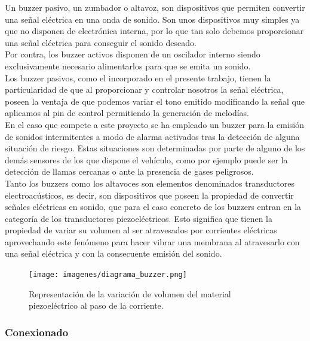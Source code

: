 Un buzzer pasivo, un zumbador o altavoz, son dispositivos que permiten convertir una señal eléctrica en una onda de sonido. Son unos dispositivos muy simples ya que no disponen 
de electrónica interna, por lo que tan solo debemos proporcionar una señal eléctrica para conseguir el sonido deseado.\\

Por contra, los buzzer activos disponen de un oscilador interno siendo exclusivamente necesario alimentarlos para que se emita un sonido.\\

Los buzzer pasivos, como el incorporado en el presente trabajo, tienen la particularidad de que al proporcionar y controlar nosotros la señal eléctrica, poseen la ventaja de
que podemos variar el tono emitido modificando la señal que aplicamos al pin de control permitiendo la generación de melodías.\\

En el caso que compete a este proyecto se ha empleado un buzzer para la emisión de sonidos intermitentes a modo de alarma activados tras la detección de alguna situación de riesgo.
Estas situaciones son determinadas por parte de alguno de los demás sensores de los que dispone el vehículo, como por ejemplo
puede ser la detección de llamas cercanas o ante la presencia de gases peligrosos.\\


Tanto los buzzers como los altavoces son elementos denominados transductores electroacústicos, es decir, son dispositivos que poseen la propiedad de convertir señales eléctricas
en sonido, que para el caso concreto de los buzzers entran en la categoría de los transductores piezoeléctricos. Esto significa que tienen la propiedad de variar su volumen al 
ser atravesados por corrientes eléctricas aprovechando este fenómeno para hacer vibrar una membrana al atravesarlo con una señal eléctrica y con la consecuente emisión del sonido.\\

 \begin{figure}[H]
  \begin{center}
    \texttt{[image: imagenes/diagrama\_buzzer.png]}
  \end{center}
  \caption{Representación de la variación de volumen del material piezoeléctrico al paso de la corriente.}
  \label{figura:sensor_mq_2_potenciometro}
\end{figure}


\subsubsection{Conexionado}

